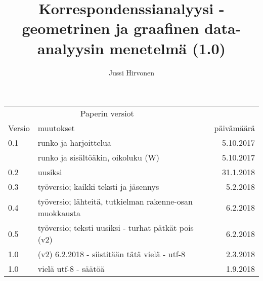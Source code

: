\documentclass[12pt,a4paper,leqno]{article}
\title{Korrespondenssianalyysi - geometrinen ja graafinen data-analyysin menetelmä (1.0)}
\author{Jussi Hirvonen}
\date{}
\theoremstyle{plain}
\theoremstyle{definition}
\theoremstyle{remark}
\begin{document}
\maketitle

\begin{tabular}{llr}
\hline
\multicolumn{2}{c}{Paperin versiot} \\
\cline{1-2}
Versio    & muutokset & päivämäärä \\
\hline
0.1      	& runko ja harjoittelua    & 5.10.2017     \\
        	& runko ja sisältöäkin, oikoluku (W)       & 5.10.2017     \\
0.2     	& uusiksi  & 31.1.2018     \\
0.3       & työversio; kaikki teksti ja jäsennys    & 5.2.2018      \\
0.4       & työversio; lähteitä, tutkielman rakenne-osan muokkausta    & 6.2.2018      \\
0.5       & työversio; teksti uusiksi - turhat pätkät pois (v2)  & 6.2.2018      \\
1.0       &  (v2) 6.2.2018  - siistitään tätä vielä -  utf-8   & 2.3.2018   \\
1.0		& vielä utf-8 - säätöä & 1.9.2018 \\



\hline
\end{tabular}

\tableofcontents









% 




	
\end{document}
